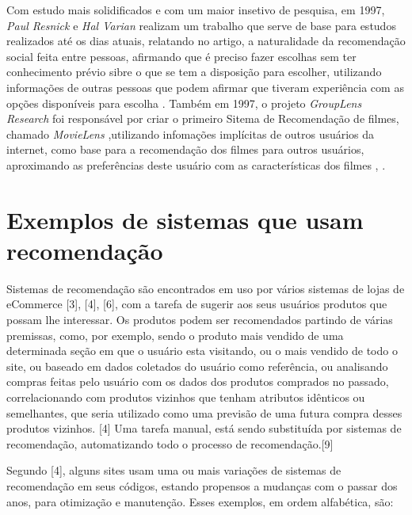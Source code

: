 \documentclass[12pt,
				openright,
				twoside,
				a4paper,
				apter=TITLE,
				section=TITLE,
				subsection=TITLE,
				chapter=TITLE,
				english,
				brazil]{abntex2}
\begin{document}
Com estudo mais solidificados e com um maior insetivo de pesquisa, em 1997, \textit{Paul Resnick} e \textit{Hal Varian} realizam um trabalho que serve de base para estudos realizados até os dias atuais, relatando no artigo, a naturalidade da recomendação social feita entre pessoas, afirmando que é preciso fazer escolhas sem ter conhecimento prévio sibre o que se tem a disposição para escolher, utilizando informações de outras pessoas que podem afirmar que tiveram experiência com as opções disponíveis para escolha \cite{resnick1997recommender}. Também em 1997, o projeto \textit{GroupLens Research} foi responsável por criar o primeiro Sitema de Recomendação de filmes, chamado \textit{MovieLens} ,utilizando infomações implícitas de outros usuários da internet, como base para a recomendação dos filmes para outros usuários, aproximando as preferências deste usuário com as características dos filmes \cite{miller2003movielens}, \cite{konstan1998recommender}.

\section{Exemplos de sistemas que usam recomendação}
Sistemas de recomendação são encontrados em uso por vários sistemas de lojas de eCommerce [3], [4], [6], com a tarefa de sugerir aos seus usuários produtos que possam lhe interessar. Os produtos podem ser recomendados partindo de várias premissas, como, por exemplo, sendo o produto mais vendido de uma determinada seção em que o usuário esta visitando, ou o
mais vendido de todo o site, ou baseado em dados coletados do usuário como referência, ou analisando compras feitas pelo usuário com os dados dos produtos comprados no passado, correlacionando com produtos vizinhos que tenham atributos idênticos ou semelhantes, que seria utilizado como uma previsão de uma futura compra desses produtos vizinhos. [4] Uma
tarefa manual, está sendo substituída por sistemas de recomendação, automatizando todo o processo de recomendação.[9] 

Segundo [4], alguns sites usam uma ou mais variações de sistemas de recomendação em seus códigos, estando propensos a mudanças com o passar dos anos, para otimização e manutenção. Esses exemplos, em ordem alfabética, são: 
\end{document}
